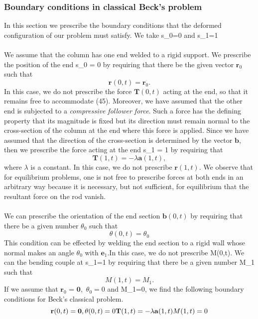 
\subsubsection{Boundary conditions in classical Beck's problem}
In this section we prescribe the boundary conditions that the deformed configuration of our problem must satisfy. We take s_0=0 and s_1=1\\\\
We assume that the column has one end welded to a rigid support. We prescribe the position of the end s_0 = 0 by requiring that there be the given vector $\mathbf{r}_0$ such that
\[ \mathbf{r}(0,t) = \mathbf{r}_0.\]
In this case, we do not prescribe the force $\mathbf{T}(0,t)$ acting at the end, so that it remains free to accommodate (45). Moreover, we have assumed that the other end is subjected to a \emph{compressive follower force}. Such a force has the defining property that its magnitude is fixed but its direction must remain normal to the cross-section of the column at the end where this force is applied. Since we have assumed that the direction of the cross-section is determined by the vector $\mathbf{b}$, then we prescribe the force acting at the end s_1 = 1 by requiring that 
\[ \mathbf{T}(1,t) = -\lambda \mathbf{a}(1,t), \]
where $\lambda$ is a constant. In this case, we do not prescribe $\mathbf{r}(1,t).$ We observe that for equilibrium problems, one is not free to prescribe forces at both ends in an arbitrary way because it is necessary, but not sufficient, for equilibrium that the resultant force on the rod vanish.
\\\\
We can prescribe the orientation of the end section $\mathbf{b}(0,t)$ by requiring that there be a given number $\theta_0$ such that
\[
\theta(0,t)=\theta_0
\]
This condition can be effected by welding the end section to a rigid wall whose normal makes an angle $\theta_0$ with $\mathbf{e}_1$.In this case, we do not prescribe M(0,t).
We can the bending couple at s_1=1 by requiring that there be a given number M_1 such that
\[ M(1,t) = M_1.\]
If we assume that $\mathbf{r}_0$ = $\mathbf{0},$ $\theta_0=0$ and M_1=0, we find the following boundary conditions for Beck's classical problem.
\[ 
\mathbf{r}(0,t) = \mathbf{0},\\
\theta(0,t) = 0\\
\mathbf{T}(1,t) = -\lambda \mathbf{a}(1,t)\\
M(1,t) = 0
\]

